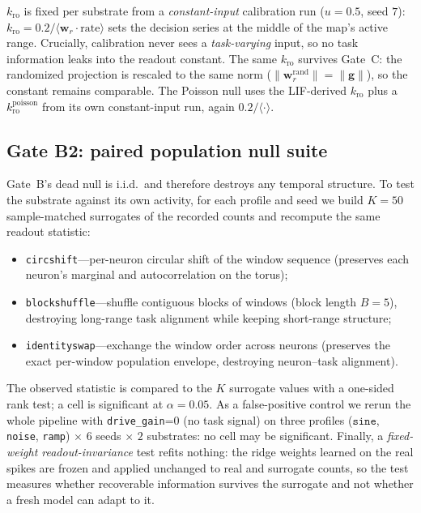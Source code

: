 \documentclass[10pt,a4paper]{article}
\begin{document}
$k_{\mathrm{ro}}$ is fixed per substrate from a \emph{constant-input}
calibration run ($u=0.5$, seed $7$): $k_{\mathrm{ro}}=0.2/
\langle \mathbf{w}_r\!\cdot \mathrm{rate}\rangle$ sets the decision
series at the middle of the map's active range. Crucially, calibration
never sees a \emph{task-varying} input, so no task information leaks
into the readout constant. The same $k_{\mathrm{ro}}$ survives Gate~C:
the randomized projection is rescaled to the same norm
($\|\mathbf{w}_r^{\mathrm{rand}}\|=\|\mathbf{g}\|$), so the constant
remains comparable. The Poisson null uses the LIF-derived $k_{\mathrm{ro}}$
plus a $k_{\mathrm{ro}}^{\mathrm{poisson}}$ from its own constant-input
run, again $0.2/\langle\cdot\rangle$.

\subsection{Gate B2: paired population null suite}\label{sec:gateb2}

Gate~B's dead null is i.i.d.\ and therefore destroys any temporal
structure. To test the substrate against its own activity, for each
profile and seed we build $K=50$ sample-matched surrogates of the
recorded counts and recompute the same readout statistic:

\begin{itemize}[nosep]
\item \texttt{circshift}---per-neuron circular shift of the window
sequence (preserves each neuron's marginal and autocorrelation on the
torus);
\item \texttt{blockshuffle}---shuffle contiguous blocks of windows
(block length $B=5$), destroying long-range task alignment while
keeping short-range structure;
\item \texttt{identityswap}---exchange the window order across neurons
(preserves the exact per-window population envelope, destroying
neuron--task alignment).
\end{itemize}

The observed statistic is compared to the $K$ surrogate values with a
one-sided rank test; a cell is significant at $\alpha=0.05$. As a
false-positive control we rerun the whole pipeline with
\texttt{drive\_gain}=0 (no task signal) on three profiles
($\mathtt{sine}$, \texttt{noise}, \texttt{ramp}) $\times$ $6$ seeds
$\times$ $2$ substrates: no cell may be significant. Finally, a
\emph{fixed-weight readout-invariance} test refits nothing: the ridge
weights learned on the real spikes are frozen and applied unchanged to
real and surrogate counts, so the test measures whether recoverable
information survives the surrogate and not whether a fresh model can
adapt to it.
\end{document}

